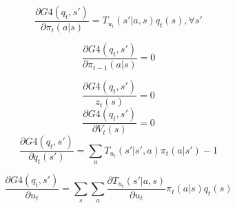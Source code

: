 \documentclass{article}
\newcommand{\Tu}{\ensuremath{T_{u_t}(s'|a,s)}}
\begin{document}
\[
\frac{\partial G4(q_t,s')}{\partial \pi_t(a|s)}=\Tu q_t(s), \forall s'
\]

\[
\frac{\partial G4(q_t,s')}{\partial \pi_{t-1}(a|s)}= 0 
\]

\[
\frac{\partial G4(q_t,s')}{z_t(s)}= 0 
\]
\[
\frac{\partial G4(q_t,s')}{\partial V_t(s)}= 0 
\]
\[
\frac{\partial G4(q_t,s')}{\partial q_t(s')}=  \sum_a T_{u_t}(s'|s',a)\pi_t(a|s')-1
\]

\[
\frac{\partial G4(q_t,s')}{\partial u_t}=\sum_s\sum_a \frac{\partial \Tu }{\partial u_t} \pi_t(a|s)q_t(s)
\]




\end{document}
